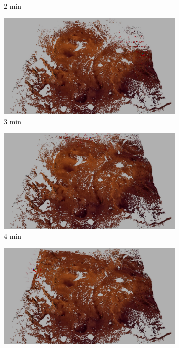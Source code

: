 \documentclass[conf]{new-aiaa}
\begin{document}
\begin{figure}[!t]
\begin{subfigure}[t]{0.49\columnwidth}
        		\caption{$2$ min}
		\vspace*{0.025\textwidth}
    	\end{subfigure}
    	\begin{subfigure}[t]{0.49\columnwidth}
           	\centering
          	\includegraphics[height=0.5\textwidth]{RdcdMarsMap3min.jpg}
        		\caption{$3$ min}
		\vspace*{0.025\textwidth}
    	\end{subfigure}
	\centering
	\begin{subfigure}[t]{0.49\columnwidth}
           	\centering
          	\includegraphics[height=0.5\textwidth]{RdcdMarsMap4min.jpg}
        		\caption{$4$ min}
		\vspace*{0.025\textwidth}
    	\end{subfigure}
    	\begin{subfigure}[t]{0.49\columnwidth}
           	\centering
          	\includegraphics[height=0.5\textwidth]{RdcdMarsMap5min.jpg}

\end{subfigure}
\end{figure}
\end{document}
